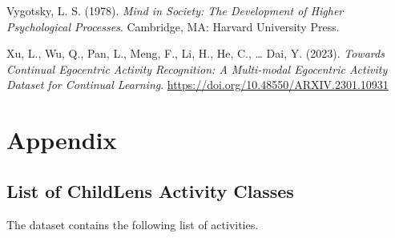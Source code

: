 \documentclass[
  man,floatsintext]{apa6}
\newlength{\cslhangindent}
\newenvironment{CSLReferences}[2] %
 {\begin{list}{}{%
  \setlength{\itemindent}{0pt}
  \setlength{\leftmargin}{0pt}
  \setlength{\parsep}{0pt}
  \ifodd #1
   \setlength{\leftmargin}{\cslhangindent}
   \setlength{\itemindent}{-1\cslhangindent}
  \fi
  \setlength{\itemsep}{#2\baselineskip}}}
 {\end{list}}
\begin{document}
\begin{CSLReferences}{1}{0}
Vygotsky, L. S. (1978). \emph{Mind in {Society}: {The Development} of {Higher Psychological Processes}}. Cambridge, MA: Harvard University Press.

Xu, L., Wu, Q., Pan, L., Meng, F., Li, H., He, C., \ldots{} Dai, Y. (2023). \emph{Towards {Continual Egocentric Activity Recognition}: {A Multi-modal Egocentric Activity Dataset} for {Continual Learning}}. \url{https://doi.org/10.48550/ARXIV.2301.10931}

\end{CSLReferences}

\endgroup

\newpage

\section{Appendix}\label{appendix}

\subsection{List of ChildLens Activity Classes}\label{list-of-childlens-activity-classes}

The dataset contains the following list of activities.
\end{document}
